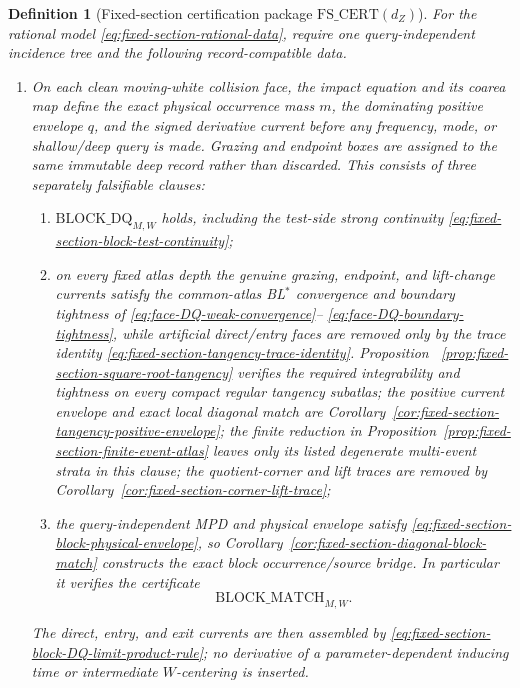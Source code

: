 \documentclass[11pt]{article}
\newtheorem{definition}[theorem]{Definition}
\begin{document}
\begin{definition}[Fixed-section certification package
$\mathrm{FS\_CERT}(d_Z)$]
\label{def:fixed-section-cert}
For the rational model \eqref{eq:fixed-section-rational-data}, require one
query-independent incidence tree and the following record-compatible data.
\begin{enumerate}[label=\textup{(FS\arabic*)}]
\item On each clean moving-white collision face, the impact equation and its
coarea map define the exact physical occurrence mass $m$, the dominating
positive envelope $q$, and the signed derivative current before any
frequency, mode, or shallow/deep query is made.  Grazing and endpoint boxes
are assigned to the same immutable deep record rather than discarded.
This consists of three separately falsifiable clauses:
\begin{enumerate}[label=\textup{(FS1\alph*)}]
\item $\mathrm{BLOCK\_DQ}_{M,W}$ holds, including the test-side strong
continuity \eqref{eq:fixed-section-block-test-continuity};
\item on every fixed atlas depth the genuine grazing, endpoint, and
lift-change currents satisfy the common-atlas BL$^*$ convergence and
boundary tightness of \eqref{eq:face-DQ-weak-convergence}--
\eqref{eq:face-DQ-boundary-tightness}, while artificial direct/entry faces
are removed only by the trace identity
\eqref{eq:fixed-section-tangency-trace-identity}.  Proposition~
\ref{prop:fixed-section-square-root-tangency} verifies the required
integrability and tightness on every compact regular tangency subatlas; the
positive current envelope and exact local diagonal match are
Corollary~\ref{cor:fixed-section-tangency-positive-envelope}; the
finite reduction in
Proposition~\ref{prop:fixed-section-finite-event-atlas} leaves only its
listed degenerate multi-event strata in this clause; the quotient-corner and
lift traces are removed by
Corollary~\ref{cor:fixed-section-corner-lift-trace};
\item the query-independent MPD and physical envelope satisfy
\eqref{eq:fixed-section-block-physical-envelope}, so
Corollary~\ref{cor:fixed-section-diagonal-block-match} constructs the exact
block occurrence/source bridge.  In particular it verifies the certificate
\[
 \mathrm{BLOCK\_MATCH}_{M,W}.
\]
\end{enumerate}
The direct, entry, and exit currents are then assembled by
\eqref{eq:fixed-section-block-DQ-limit-product-rule}; no derivative of a
parameter-dependent inducing time or intermediate $W$-centering is inserted.

\end{enumerate}
\end{definition}
\end{document}
